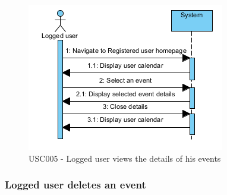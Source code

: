 \documentclass[10pt,a4paper,titlepage]{article}
\begin{document}
\begin{figure}[h]
\centering
\includegraphics[width=\linewidth]{./Sequence_diag/USC005.png}
\caption[USC005]{USC005 - Logged user views the details of his events}
\label{fig:USC005}
\end{figure}

\clearpage
\subsubsection{Logged user deletes an event}
\end{document}
